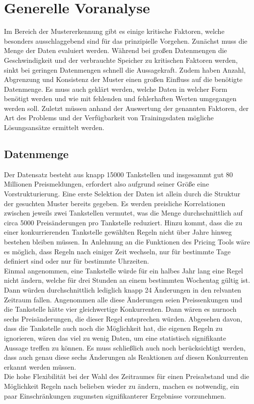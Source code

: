 \section{Generelle Voranalyse}
Im Bereich der Mustererkennung gibt es einige kritische Faktoren, welche besonders ausschlaggebend sind für das prinzipielle Vorgehen. Zunächst muss die Menge der Daten evaluiert werden. Während bei großen Datenmengen die Geschwindigkeit und der verbrauchte Speicher zu kritischen Faktoren werden, sinkt bei geringen Datenmengen schnell die Aussagekraft. Zudem haben Anzahl, Abgrenzung und Konsistenz der Muster einen großen Einfluss auf die benötigte Datenmenge. Es muss auch geklärt werden, welche Daten in welcher Form benötigt werden und wie mit fehlenden und fehlerhaften Werten umgegangen werden soll. Zuletzt müssen anhand der Auswertung der genannten Faktoren, der Art des Problems und der Verfügbarkeit von Trainingsdaten mögliche Lösungsansätze ermittelt werden.

\subsection{Datenmenge}
Der Datensatz besteht aus knapp 15000 Tankstellen und insgesammt gut 80 Millionen Preismeldungen, erfordert also aufgrund seiner Größe eine Vorstrukturierung. Eine erste Selektion der Daten ist allein durch die Struktur der gesuchten Muster bereits gegeben. Es werden preisliche Korrelationen zwischen jeweils zwei Tankstellen vermutet, was die Menge durchschnittlich auf  circa 5000 Preisänderungen pro Tankstelle reduziert. Hinzu kommt, dass die zu einer konkurrierenden Tankstelle gewählten Regeln nicht über Jahre hinweg bestehen bleiben müssen. In Anlehnung an die Funktionen des Pricing Tools wäre es möglich, dass Regeln nach einiger Zeit wechseln, nur für bestimmte Tage definiert sind oder nur für bestimmte Uhrzeiten.\\
Einmal angenommen, eine Tankstelle würde für ein halbes Jahr lang eine Regel nicht ändern, welche für drei Stunden an einem bestimmten Wochentag gültig ist. Dann würden durchschnittlich lediglich knapp 24 Änderungen in den relvanten Zeitraum fallen. Angenommen alle diese Änderungen seien  Preissenkungen und die Tankstelle hätte vier gleichwertige Konkurrenten. Dann wären es nurnoch sechs Preisänderungen, die dieser Regel entsprechen würden. Abgesehen davon, dass die Tankstelle auch noch die Möglichkeit hat, die eigenen Regeln zu ignorieren, wären das viel zu wenig Daten, um eine statistisch signifikante Aussage treffen zu können. Es muss schließlich auch noch berücksichtigt werden, dass auch genau diese sechs Änderungen als Reaktionen auf diesen Konkurrenten erkannt werden müssen.\\
Die hohe Flexibilität bei der Wahl des Zeitraumes für einen Preisabstand und die Möglichkeit Regeln nach belieben wieder zu ändern, machen es notwendig, ein paar Einschränkungen zugunsten signifikanterer Ergebnisse vorzunehmen.

